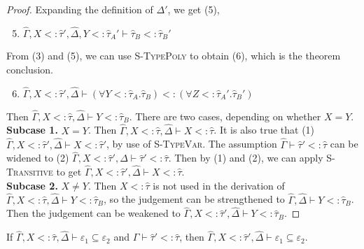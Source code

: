 \documentclass{llncs}
\begin{document}
\begin{proof}
Expanding the definition of $\Delta'$, we get (5),

\begin{enumerate}
	\setcounter{enumi}{4}
	\item $\hat \Gamma, X <: \hat \tau', \hat \Delta, Y <: \hat \tau_A' \vdash \hat \tau_B <: \hat \tau_B'$
\end{enumerate}

From (3) and (5), we can use \textsc{S-TypePoly} to obtain (6), which is the theorem conclusion.

\begin{enumerate}
	\setcounter{enumi}{5}
	\item $\hat \Gamma, X <: \hat \tau', \hat \Delta \vdash (\forall Y <: \hat \tau_A. \hat \tau_B) <: (\forall Z <: \hat \tau_A'. \hat \tau_B')$
\end{enumerate}


 Then $\hat \Gamma, X <: \hat \tau, \hat \Delta \vdash Y <: \hat \tau_B$. There are two cases, depending on whether $X = Y$.\\

\textbf{Subcase 1.} $X = Y$. Then $\hat \Gamma, X <: \hat \tau, \hat \Delta \vdash X <: \hat \tau$. It is also true that (1) $\hat \Gamma, X <: \hat \tau', \hat \Delta \vdash X <: \hat \tau'$, by use of \textsc{S-TypeVar}. The assumption $\hat \Gamma \vdash \hat \tau' <: \hat \tau$ can be widened to (2) $\hat \Gamma, X <: \hat \tau', \hat \Delta \vdash \hat \tau' <: \hat \tau$. Then by (1) and (2), we can apply \textsc{S-Transitive} to get $\hat \Gamma, X <: \hat \tau', \hat \Delta \vdash X <: \hat \tau$. \\

\textbf{Subcase 2.} $X \neq Y$. Then $X <: \hat \tau$ is not used in the derivation of $\hat \Gamma, X <: \hat \tau, \hat \Delta \vdash Y <: \hat \tau_B$, so the judgement can be strengthened to $\hat \Gamma, \hat \Delta \vdash Y <: \hat \tau_B$. Then the judgement can be weakened to $\hat \Gamma, X <: \hat \tau', \hat \Delta \vdash Y <: \hat \tau_B$.


\end{proof}

\hrulefill

\begin{lemma}
If $\hat \Gamma, X <: \hat \tau, \hat \Delta \vdash \varepsilon_1 \subseteq \varepsilon_2$ and $\hat \Gamma \vdash \hat \tau' <: \hat \tau$, then $\hat \Gamma, X <: \hat \tau', \hat \Delta \vdash \varepsilon_1 \subseteq \varepsilon_2$.
\end{lemma}
\end{document}
